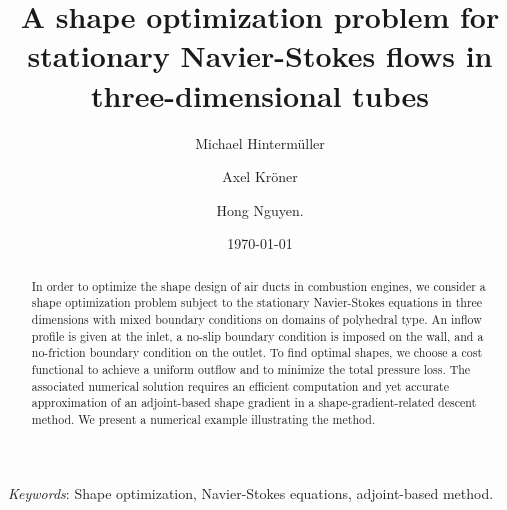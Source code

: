 \documentclass[oneside]{article}
\title{A shape optimization problem for stationary Navier-Stokes flows in three-dimensional tubes}
\author{Michael Hinterm\"uller}
\author{Axel Kr\"oner}
\author{Hong Nguyen.}
\affil{WIAS Berlin, Germany.}
\date{\today}
\begin{document}
\maketitle
\thispagestyle{empty}
\begin{abstract}
    In order to optimize the shape design of air ducts in combustion engines, we consider a shape optimization problem subject to the stationary Navier-Stokes equations in three dimensions with mixed boundary conditions on domains of polyhedral type. An inflow profile is given at the inlet, a no-slip boundary condition is imposed on the wall, and a no-friction boundary condition on the outlet. To find optimal shapes, we choose a cost functional to achieve a uniform outflow and to minimize the total pressure loss. The associated numerical solution requires an efficient computation and yet accurate approximation of an adjoint-based shape gradient in a shape-gradient-related descent method. We present a numerical example illustrating the method.
\end{abstract}
\textit{Keywords}: Shape optimization, Navier-Stokes equations, adjoint-based method.
\end{document}

